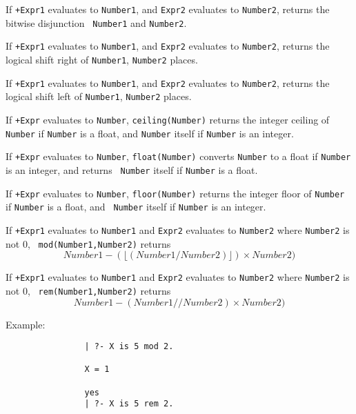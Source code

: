 \begin{description}
 If {\tt +Expr1} evaluates to {\tt Number1}, and {\tt Expr2}
evaluates to {\tt Number2}, returns the bitwise disjunction {\tt
Number1} and {\tt Number2}.

 If {\tt +Expr1} evaluates to {\tt Number1}, and {\tt Expr2}
evaluates to {\tt Number2}, returns the logical shift right of 
{\tt Number1}, {\tt Number2} places.

 If {\tt +Expr1} evaluates to {\tt Number1}, and {\tt Expr2}
evaluates to {\tt Number2}, returns the logical shift left of 
{\tt Number1}, {\tt Number2} places.

If {\tt +Expr} evaluates to {\tt Number}, {\tt ceiling(Number)}
returns the integer ceiling of {\tt Number} if {\tt Number} is a
float, and {\tt Number} itself if {\tt Number} is an integer.

 If
{\tt +Expr} evaluates to {\tt Number}, {\tt float(Number)} converts 
{\tt Number} to a float if {\tt Number} is an integer, and returns {\tt
Number} itself if {\tt Number} is a float.

 If
{\tt +Expr} evaluates to {\tt Number}, {\tt floor(Number)} returns the
integer floor of {\tt Number} if {\tt Number} is a float, and {\tt
Number} itself if {\tt Number} is an integer.

If {\tt +Expr1} evaluates to {\tt Number1} and {\tt Expr2} evaluates
to {\tt Number2} where {\tt Number2} is not 0, {\tt
mod(Number1,Number2)} returns
\[
	Number1 - (\lfloor (Number1 / Number2) \rfloor) \times Number2)
\]

If {\tt +Expr1} evaluates to {\tt Number1} and {\tt Expr2} evaluates
to {\tt Number2} where {\tt Number2} is not 0, {\tt
rem(Number1,Number2)} returns
\[
	Number1 - ({Number1} // {Number2}) \times Number2)
\]

    Example:
    {\footnotesize
     \begin{verbatim}
                | ?- X is 5 mod 2.

                X = 1

                yes
                | ?- X is 5 rem 2.


\end{verbatim}}
\end{description}
